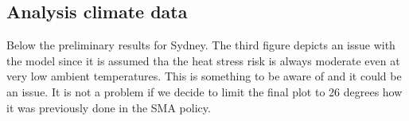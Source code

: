 \documentclass[11pt]{article}
\begin{document}
    \subsection{Analysis climate data}
    Below the preliminary results for Sydney.
    The third figure depicts an issue with the model since it is assumed tha the heat stress risk is always moderate even at very low ambient temperatures.
    This is something to be aware of and it could be an issue.
    It is not a problem if we decide to limit the final plot to 26 degrees how it was previously done in the SMA policy.
%
%
%
%
%
%
%
%
%
\end{document}

